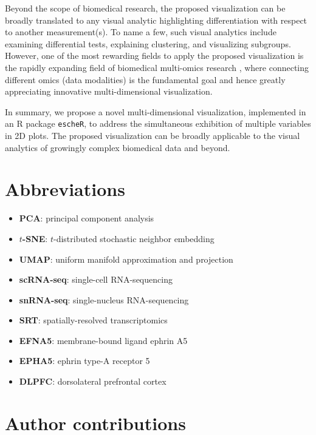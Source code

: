 \documentclass[10pt,twocolumn]{article}
\begin{document}
Beyond the scope of biomedical research, the proposed visualization can be broadly translated to any visual analytic highlighting differentiation with respect to another measurement(s). To name a few, such visual analytics include examining differential tests,  explaining clustering, and visualizing subgroups. However, one of the most rewarding fields to apply the proposed visualization is the rapidly expanding field of biomedical multi-omics research \cite{hasin_2017}, where connecting different omics (data modalities) is the fundamental goal and hence greatly appreciating innovative multi-dimensional visualization. 

In summary, we propose a novel multi-dimensional visualization, implemented in an R package \texttt{escheR}, to address the simultaneous exhibition of multiple variables in 2D plots. The proposed visualization can be broadly applicable to the visual analytics of growingly complex biomedical data and beyond.



\section*{Abbreviations}

\begin{itemize}[nosep]
    \item \textbf{PCA}: principal component analysis
    \item \textbf{$t$-SNE}: $t$-distributed stochastic neighbor embedding
    \item \textbf{UMAP}: uniform manifold approximation and projection
    \item \textbf{scRNA-seq}: single-cell RNA-sequencing
    \item \textbf{snRNA-seq}: single-nucleus RNA-sequencing
    \item \textbf{SRT}: spatially-resolved transcriptomics 
    \item \textbf{EFNA5}: membrane-bound ligand ephrin A5
    \item \textbf{EPHA5}: ephrin type-A receptor 5
    \item \textbf{DLPFC}: dorsolateral prefrontal cortex
\end{itemize}

\section*{Author contributions}
\end{document}

